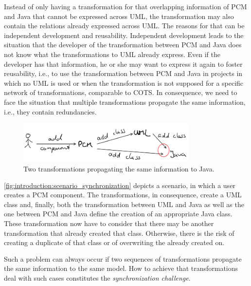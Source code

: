 Instead of only having a transformation for that overlapping information of \gls{PCM} and Java that cannot be expressed across \gls{UML}, the transformation may also contain the relations already expressed across \gls{UML}.
The reasons for that can be independent development and reusability.
Independent development leads to the situation that the developer of the transformation between \gls{PCM} and Java does not know what the transformations to \gls{UML} already express.
Even if the developer has that information, he or she may want to express it again to foster reusability, i.e., to use the transformation between \gls{PCM} and Java in projects in which no \gls{UML} is used or when the transformation is not supposed for a specific network of transformations, comparable to \gls{COTS}.
In consequence, we need to face the situation that multiple transformations propagate the same information, i.e., they contain redundancies.

\begin{figure}
    \centering
    \includegraphics[width=0.8\textwidth]{figures/prologue/introduction/scenario_synchronization.png}
    \caption[Example for transformation synchronization]{Two transformations propagating the same information to Java.}
    \label{fig:introduction:scenario_synchronization}
\end{figure}

\autoref{fig:introduction:scenario_synchronization} depicts a scenario, in which a user creates a \gls{PCM} component.
The transformations, in consequence, create a \gls{UML} class and, finally, both the transformation between \gls{UML} and Java as well as the one between \gls{PCM} and Java define the creation of an appropriate Java class.
These transformation now have to consider that there may be another transformation that already created that class.
Otherwise, there is the risk of creating a duplicate of that class or of overwriting the already created on.

Such a problem can always occur if two sequences of transformations propagate the same information to the same model. %
How to achieve that transformations deal with such cases constitutes the \emph{synchronization challenge}.

